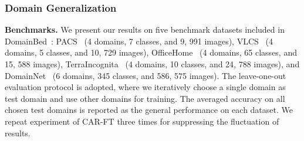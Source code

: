 \documentclass[pdflatex,sn-basic,iicol]{sn-jnl}
\theoremstyle{thmstyleone}\newtheorem{theorem}{Theorem}\newtheorem{proposition}[theorem]{Proposition}
\theoremstyle{thmstyletwo}\newtheorem{example}{Example}\newtheorem{remark}{Remark}
\theoremstyle{thmstylethree}\newtheorem{definition}{Definition}
\begin{document}
\subsubsection{Domain Generalization}\label{sec:dg}
\noindent\textbf{Benchmarks.} We present our results on five benchmark datasets included in DomainBed~\citep{gulrajani2020search}: PACS~\citep{li2017deeper} (4 domains, 7 classes, and 9, 991 images), VLCS~\citep{torralba2011unbiased} (4 domains, 5 classes, and 10, 729 images), OfficeHome~\citep{venkateswara2017deep} (4 domains, 65 classes, and 15, 588 images), TerraIncognita~\citep{beery2018recognition} (4 domains, 10 classes, and 24, 788 images), and DomainNet~\citep{peng2019moment} (6 domains, 345 classes, and 586, 575 images). The leave-one-out evaluation protocol is adopted, where we iteratively choose a single domain as test domain and use other domains for training. The averaged accuracy on all chosen test domains is reported as the general performance on each dataset. We repeat experiment of CAR-FT three times for suppressing the fluctuation of results. 
\end{document}
